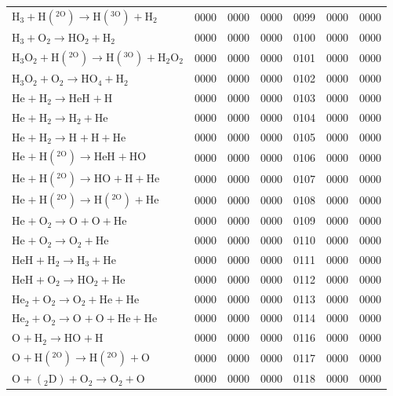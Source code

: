\begin{longtable}{lrrrrrr}
$\mathrm{H_3^{} + H(^{2O}) \rightarrow H(^{3O})^{} + H_2}$ & 0000 & 0000 & 0000 & 0099 & 0000 & 0000 \\
$\mathrm{H_3^{} + O_2 \rightarrow HO_2^{} + H_2}$ & 0000 & 0000 & 0000 & 0100 & 0000 & 0000 \\
$\mathrm{H_3O_2^{} + H(^{2O}) \rightarrow H(^{3O})^{} + H_2O_2}$ & 0000 & 0000 & 0000 & 0101 & 0000 & 0000 \\
$\mathrm{H_3O_2^{} + O_2 \rightarrow HO_4^{} + H_2}$ & 0000 & 0000 & 0000 & 0102 & 0000 & 0000 \\
$\mathrm{He^{} + H_2 \rightarrow HeH^{} + H}$ & 0000 & 0000 & 0000 & 0103 & 0000 & 0000 \\
$\mathrm{He^{} + H_2 \rightarrow H_2^{} + He}$ & 0000 & 0000 & 0000 & 0104 & 0000 & 0000 \\
$\mathrm{He^{} + H_2 \rightarrow H^{} + H + He}$ & 0000 & 0000 & 0000 & 0105 & 0000 & 0000 \\
$\mathrm{He^{} + H(^{2O}) \rightarrow HeH^{} + HO}$ & 0000 & 0000 & 0000 & 0106 & 0000 & 0000 \\
$\mathrm{He^{} + H(^{2O}) \rightarrow HO^{} + H + He}$ & 0000 & 0000 & 0000 & 0107 & 0000 & 0000 \\
$\mathrm{He^{} + H(^{2O}) \rightarrow H(^{2O})^{} + He}$ & 0000 & 0000 & 0000 & 0108 & 0000 & 0000 \\
$\mathrm{He^{} + O_2 \rightarrow O^{} + O + He}$ & 0000 & 0000 & 0000 & 0109 & 0000 & 0000 \\
$\mathrm{He^{} + O_2 \rightarrow O_2^{} + He}$ & 0000 & 0000 & 0000 & 0110 & 0000 & 0000 \\
$\mathrm{HeH^{} + H_2 \rightarrow H_3^{} + He}$ & 0000 & 0000 & 0000 & 0111 & 0000 & 0000 \\
$\mathrm{HeH^{} + O_2 \rightarrow HO_2^{} + He}$ & 0000 & 0000 & 0000 & 0112 & 0000 & 0000 \\
$\mathrm{He_2^{} + O_2 \rightarrow O_2^{} + He + He}$ & 0000 & 0000 & 0000 & 0113 & 0000 & 0000 \\
$\mathrm{He_2^{} + O_2 \rightarrow O^{} + O + He + He}$ & 0000 & 0000 & 0000 & 0114 & 0000 & 0000 \\
$\mathrm{O^{} + H_2 \rightarrow HO^{} + H}$ & 0000 & 0000 & 0000 & 0116 & 0000 & 0000 \\
$\mathrm{O^{} + H(^{2O}) \rightarrow H(^{2O})^{} + O}$ & 0000 & 0000 & 0000 & 0117 & 0000 & 0000 \\
$\mathrm{O^{} + (_2D) + O_2 \rightarrow O_2^{} + O}$ & 0000 & 0000 & 0000 & 0118 & 0000 & 0000 \\

\end{longtable}
